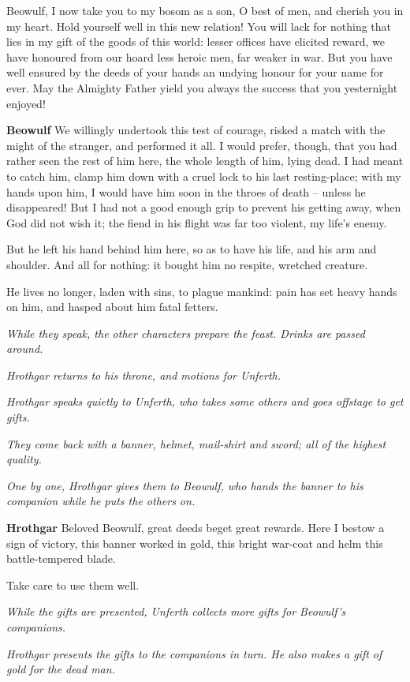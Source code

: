 \documentclass[a4paper]{article}
\begin{document}
{Beowulf, I now take you
to my bosom as a son, O best of men,
and cherish you in my heart. Hold yourself well
in this new relation! You will lack for nothing
that lies in my gift of the goods of this world:
lesser offices have elicited reward,
we have honoured from our hoard less heroic men,
far weaker in war. But you have well ensured
by the deeds of your hands an undying honour
for your name for ever. May the Almighty Father
yield you always the success that you yesternight enjoyed!

\textbf{Beowulf} We willingly undertook this test of courage,
risked a match with the might of the stranger,
and performed it all. I would prefer, though,
that you had rather seen the rest of him here,
the whole length of him, lying dead.
I had meant to catch him, clamp him down
with a cruel lock to his last resting-place;
with my hands upon him, I would have him soon
in the throes of death – unless he disappeared!
But I had not a good enough grip to prevent
his getting away, when God did not wish it;
the fiend in his flight was far too violent,
my life's enemy. 

\newpage
But he left his hand
behind him here, so as to have his life,
and his arm and shoulder. And all for nothing:
it bought him no respite, wretched creature.

He lives no longer, laden with sins,
to plague mankind: pain has set
heavy hands on him, and hasped about him
fatal fetters. 

\centerline{\textit{While they speak, the other characters prepare the feast. Drinks are passed around.}}
\centerline{\textit{Hrothgar returns to his throne, and motions for Unferth.}}

\centerline{\textit{Hrothgar speaks quietly to Unferth, who takes some others and goes offstage to get gifts.}}
\centerline{\textit{They come back with a banner, helmet, mail-shirt and sword; all of the highest quality.}}
\centerline{\textit{One by one, Hrothgar gives them to Beowulf, who hands the banner to his companion while he puts the others on.}}

\textbf{Hrothgar} Beloved Beowulf,
great deeds beget great rewards. 
Here I bestow a sign of victory,
this banner worked in gold,
this bright war-coat and helm
this battle-tempered blade.

Take care to use them well.

\centerline{\textit{While the gifts are presented, Unferth collects more gifts for Beowulf's companions.}}
\centerline{\textit{Hrothgar presents the gifts to the companions in turn. He also makes a gift of gold for the dead man.}}

}
\end{document}
